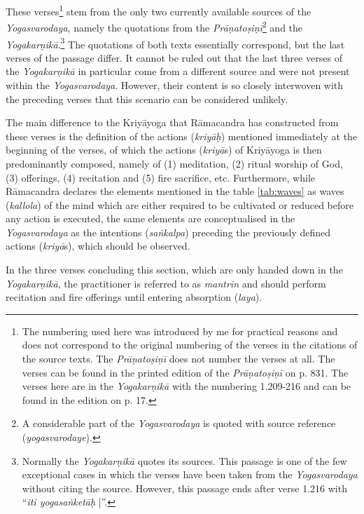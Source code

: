 These verses\footnote{The numbering used here was introduced by me for practical reasons and does not correspond to the original numbering of the verses in the citations of the source texts. The \textit{Prāṇatoṣiṇī} does not number the verses at all. The verses can be found in the printed edition of the \textit{Prāṇatoṣiṇī} on p. 831. The verses here are in the \textit{Yogakarṇikā} with the numbering 1.209-216 and can be found in the edition on p. 17.} stem from the only two currently available sources of the \textit{Yogasvarodaya}, namely the quotations from the \textit{Prāṇatoṣiṇī}\footnote{A considerable part of the \textit{Yogasvarodaya} is quoted with source reference (\textit{yogasvarodaye}).} and the \textit{Yogakarṇikā}.\footnote{Normally the \textit{Yogakarṇikā} quotes its sources. This passage is one of the few exceptional cases in which the verses have been taken from the \textit{Yogasvarodaya} without citing the source. However, this passage ends after verse 1.216 with ``\textit{iti yogasaṅketāḥ} |''.} The quotations of both texts essentially correspond, but the last verses of the passage differ. It cannot be ruled out that the last three verses of the \textit{Yogakarṇikā} in particular come from a different source and were not present within the \textit{Yogasvarodaya}. However, their content is so closely interwoven with the preceding verses that this scenario can be considered unlikely.

The main difference to the Kriyāyoga that Rāmacandra has constructed from these verses is the definition of the actions (\textit{kriyāḥ}) mentioned immediately at the beginning of the verses, of which the actions (\textit{kriyā}s) of Kriyāyoga is then predominantly composed, namely of (1) meditation, (2) ritual worship of God, (3) offerings, (4) recitation and (5) fire sacrifice, etc. Furthermore, while Rāmacandra declares the elements mentioned in the table \ref{tab:waves} as waves (\textit{kallola}) of the mind which are either required to be cultivated or reduced before any action is executed, the same elements are conceptualised in the \textit{Yogasvarodaya} as the intentions (\textit{saṅkalpa}) preceding the previously defined actions (\textit{kriyā}s), which should be observed.

In the three verses concluding this section, which are only handed down in the \textit{Yogakarṇikā}, the practitioner is referred to as \textit{mantrin} and should perform recitation and fire offerings until entering absorption (\textit{laya}).

